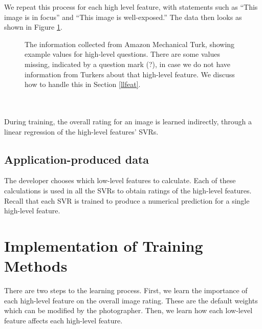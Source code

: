 \documentclass[11pt,letter]{article}
\begin{document}
We repeat this process for each high level feature, with statements such as ``This image is in focus'' and ``This image is well-exposed.'' The data then looks as shown in Figure \ref{fig:turktable}.

\begin{figure}
\centering
{}
\caption{The information collected from Amazon Mechanical Turk, showing example values for high-level questions. There are some values missing, indicated by a question mark (?), in case we do not have information from Turkers about that high-level feature. We discuss how to handle this in Section \ref{llfeat}.}
\label{fig:turktable}
\end{figure}

\\
\\

During training, the overall rating for an image is learned indirectly, through a linear regression of the high-level features' SVRs.

\subsection{Application-produced data}
The developer chooses which low-level features to calculate. Each of these calculations is used in all the SVRs to obtain ratings of the high-level features. Recall that each SVR is trained to produce a numerical prediction for a single high-level feature.


\section{Implementation of Training Methods}
\label{methods}

There are two steps to the learning process. First, we learn the importance of each high-level feature on the overall image rating. These are the default weights which can be modified by the photographer. Then, we learn how each low-level feature affects each high-level feature.
\end{document}

